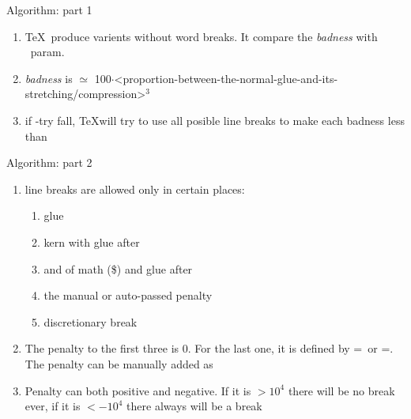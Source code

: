 \begin{frame}{Algorithm: part 1\magicPage}\relax
    
    \begin{enumerate}
        \item \TeX\ produce varients without word breaks. It compare the \textit{badness} with \ccol\pretolerance\ param. 
        \item \textit{badness} is $\simeq$ 100$\cdot$<proportion-between-the-normal-glue-and-its-stretching/compression>$^3$
        \item if \ccol\pretolerance-try fall, \TeX will try to use all posible line breaks to make each badness less than \ccol\tolerance
         
    \end{enumerate}
     
\end{frame}

\begin{frame}{Algorithm: part 2\magicPage}\relax

    \begin{enumerate}
        \item line breaks are allowed only in certain places:
        \begin{enumerate}
            \item glue
            \item kern with glue after 
            \item and of math (\$) and glue after 
            \item the manual or auto-passed penalty
            \item  discretionary break
        \end{enumerate}
        \item The penalty to the first three is $0$. For the last one, it is defined by \ccol\hyphenpenalty=\ or \ccol\exhyphenpenalty=. The penalty can be manually added as \ccol\penalty
        \item Penalty can both positive and negative. If it is $>10^4$ there will be no break ever, if it is $<-10^4$ there always will be a break
         
    \end{enumerate}
         
\end{frame}


